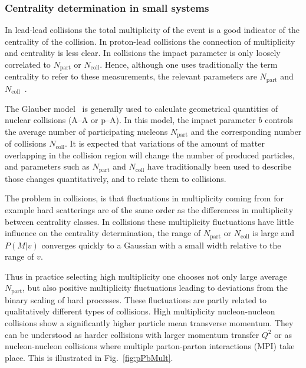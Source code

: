 \subsubsection{Centrality determination in small systems}
In lead-lead collisions the total multiplicity of the event is a good indicator of the centrality of the collision. In proton-lead collisions the connection of multiplicity and centrality is less clear. In \pPb collisions the impact parameter is only loosely correlated to $N_\mathrm{part}$ or $N_\mathrm{coll}$. Hence, although one uses traditionally the term centrality to refer to these measurements, the relevant parameters are $N_\mathrm{part}$ and $N_\mathrm{coll}$~\cite{Adam:2014qja}.

The Glauber model~\cite{glauber} is generally used to calculate geometrical quantities of nuclear collisions (A–A or p–A). In this model, the impact parameter $b$ controls the average number of participating nucleons $N_\mathrm{part}$ and the corresponding number of collisions $N_\mathrm{coll}$. It is expected that variations of the amount of matter overlapping in the collision region will change the number of produced particles, and parameters such as $N_\mathrm{part}$ and $N_\mathrm{coll}$ have traditionally been used to describe those
changes quantitatively, and to relate them to \pp collisions.




The problem in \pPb collisions, is that fluctuations in multiplicity coming from for example hard scatterings are of the same order as the differences in multiplicity between centrality classes. In \PbPb collisions these multiplicity fluctuations have little influence on the centrality determination, the range of $N_\mathrm{part}$ or $N_\mathrm{coll}$ is large and $P\left(M|v\right)$ converges quickly to a Gaussian with a small width relative to the range of $v$. 

Thus in practice selecting high multiplicity one chooses not only large average $N_\mathrm{part}$, but also positive multiplicity fluctuations leading to deviations from the binary scaling of hard processes. These fluctuations are partly related to qualitatively different types of collisions. High multiplicity nucleon-nucleon collisions show a significantly higher particle mean transverse momentum. They can be understood as harder collisions with larger momentum transfer $Q^2$ or as nucleon-nucleon collisions where multiple parton-parton interactions (MPI) take place. This is illustrated in Fig.~\ref{fig:pPbMult}.

